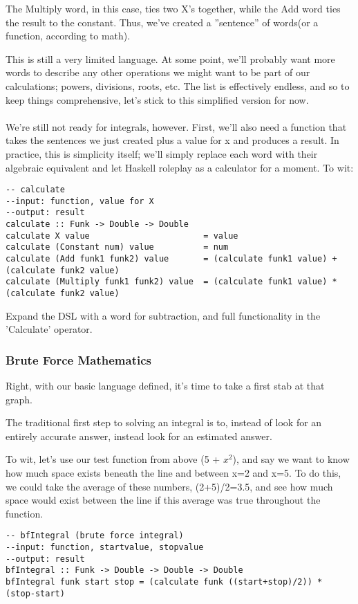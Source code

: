 The Multiply word, in this case, ties two X's together, while the Add word ties the result to the constant. Thus, we've created a ''sentence'' of words(or a function, according to math).

This is still a very limited language. At some point, we'll probably want more words to describe any other operations we might want to be part of our calculations; powers, divisions, roots, etc. The list is effectively endless, and so to keep things comprehensive, let's stick to this simplified version for now.

\paragraph{} We're still not ready for integrals, however. First, we'll also need a function that takes the sentences we just created plus a value for x and produces a result. In practice, this is simplicity itself; we'll simply replace each word with their algebraic equivalent and let Haskell roleplay as a calculator for a moment. To wit:
\begin{verbatim}
-- calculate
--input: function, value for X
--output: result
calculate :: Funk -> Double -> Double
calculate X value                       = value
calculate (Constant num) value          = num
calculate (Add funk1 funk2) value       = (calculate funk1 value) + (calculate funk2 value)
calculate (Multiply funk1 funk2) value  = (calculate funk1 value) * (calculate funk2 value)
\end{verbatim}

\begin{exercise}
Expand the DSL with a word for subtraction, and full functionality in the 'Calculate' operator. 
\end{exercise}


\subsubsection{Brute Force Mathematics}
Right, with our basic language defined, it's time to take a first stab at that graph.

The traditional first step to solving an integral is to, instead of look for an entirely accurate answer, instead look for an estimated answer.

To wit, let's use our test function from above (5 + $x^2$), and say we want to know how much space exists beneath the line and between x=2 and x=5. To do this, we could take the average of these numbers, (2+5)/2=3.5, and see how much space would exist between the line if this average was true throughout the function.
\begin{verbatim}
-- bfIntegral (brute force integral)
--input: function, startvalue, stopvalue
--output: result
bfIntegral :: Funk -> Double -> Double -> Double
bfIntegral funk start stop = (calculate funk ((start+stop)/2)) * (stop-start)
\end{verbatim}

